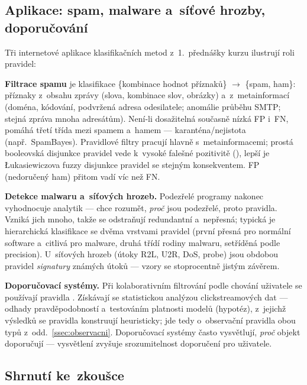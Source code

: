 \documentclass[11pt,a4paper]{article}
\theoremstyle{definition}
\begin{document}
\subsection{Aplikace: spam, malware a~síťové hrozby, doporučování}
\label{ssec:aplikace-pravidel}

Tři internetové aplikace klasifikačních metod z~1.~přednášky kurzu ilustrují roli
pravidel:

\textbf{Filtrace spamu} je klasifikace \{kombinace hodnot příznaků\} $\to$ \{spam, ham\}:
příznaky z~obsahu zprávy (slova, kombinace slov, obrázky) a~z~metainformací (doména,
kódování, podvržená adresa odesilatele; anomálie průběhu SMTP; stejná zpráva mnoha
adresátům). Není-li dosažitelná současně nízká FP i~FN, pomáhá třetí třída mezi spamem
a~hamem --- karanténa/nejistota (např.\ SpamBayes). Pravidlové filtry pracují hlavně
s~metainformacemi; prostá booleovská disjunkce pravidel vede k~vysoké falešné pozitivitě
(), lepší je Łukasiewiczova fuzzy
disjunkce pravidel se stejným konsekventem. FP (nedoručený ham) přitom vadí víc než FN.

\textbf{Detekce malwaru a~síťových hrozeb.} Podezřelé programy nakonec vyhodnocuje
analytik --- chce rozumět, \emph{proč} jsou podezřelé, proto pravidla. Vzniká jich mnoho,
takže se odstraňují redundantní a~nepřesná; typická je hierarchická klasifikace se dvěma
vrstvami pravidel (první přesná pro normální software a~citlivá pro malware, druhá třídí
rodiny malwaru, setříděná podle precision). U~síťových hrozeb (útoky R2L, U2R, DoS,
probe) jsou obdobou pravidel \emph{signatury} známých útoků --- vzory se stoprocentně
jistým závěrem.

\textbf{Doporučovací systémy.} Při kolaborativním filtrování podle chování uživatele se
používají pravidla . Získávají se statistickou analýzou
clickstreamových dat --- odhady pravděpodobností a~testováním platnosti modelů
(hypotéz), z~jejichž výsledků se pravidla konstruují heuristicky; jde tedy o~observační
pravidla obou typů z~odd.~\ref{ssec:observacni}. Doporučovací systémy často vysvětlují,
\emph{proč} objekt doporučují --- vysvětlení zvyšuje srozumitelnost doporučení pro
uživatele.

\subsection{Shrnutí ke~zkoušce}
\end{document}
